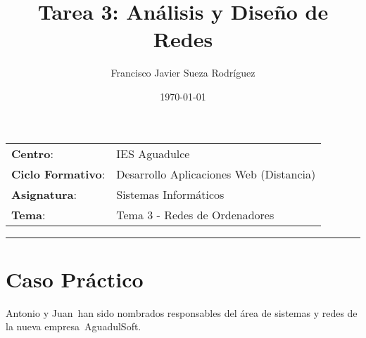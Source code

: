 


\title{
\vspace{10ex}
\normalfont \normalsize
\Huge \textbf{Tarea 3: Análisis y Diseño de Redes}
}
\author{Francisco Javier Sueza Rodríguez}
\date{\normalsize\today}



\maketitle

\thispagestyle{empty}

\vspace{68ex}

\begin{center}
    \begin{tabular}{l l}
        \textbf{Centro}: & IES Aguadulce \\
        \textbf{Ciclo Formativo}: & Desarrollo Aplicaciones Web (Distancia)\\
        \textbf{Asignatura}: & Sistemas Informáticos\\
        \textbf{Tema}: & Tema 3 -  Redes de Ordenadores\\
    \end{tabular}
\end{center}

\newpage

\tableofcontents

\vspace{15ex}

\hrule

\vspace{10ex}

\listoffigures

\newpage

\section{Caso Práctico}
Antonio y Juan han sido nombrados responsables del área de sistemas y redes de la nueva empresa AguadulSoft.

